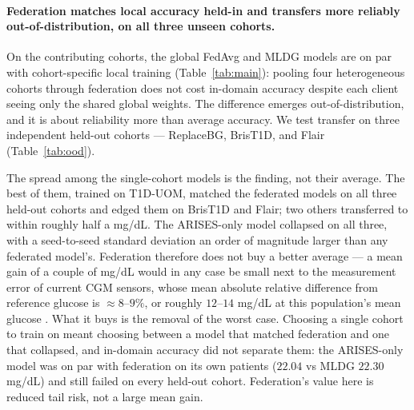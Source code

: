 \documentclass[10pt,letterpaper]{article}
\begin{document}
\paragraph{Federation matches local accuracy held-in and transfers more reliably
out-of-distribution, on all three unseen cohorts.} On the contributing cohorts,
the global FedAvg and MLDG models are on par with cohort-specific local training
(Table~\ref{tab:main}): pooling four
heterogeneous cohorts through federation does not cost in-domain accuracy despite
each client seeing only the shared global weights. The difference emerges
out-of-distribution, and it is about reliability more than average accuracy. We
test transfer on three independent held-out cohorts --- ReplaceBG, BrisT1D, and
Flair (Table~\ref{tab:ood}).

The spread among the single-cohort models is the finding, not their average.
The best of them, trained on T1D-UOM, matched the federated models on all
three held-out cohorts and edged them on BrisT1D and Flair; two others
transferred to within roughly half a mg/dL. The ARISES-only model collapsed on
all three, with a seed-to-seed standard deviation an order of magnitude larger
than any federated model's. Federation therefore does not buy a better average
--- a mean gain of a couple of mg/dL would in any case be small next to the
measurement error of current CGM sensors, whose mean absolute relative
difference from reference glucose is $\approx 8$--$9\%$, or roughly $12$--$14$
mg/dL at this population's mean glucose
\cite{garg2022dexcomg7,alva2023libre3}. What it buys is the removal of the
worst case. Choosing a single cohort to train on meant choosing between a model
that matched federation and one that collapsed, and in-domain accuracy did not
separate them: the ARISES-only model was on par with federation on its own
patients ($22.04$ vs MLDG $22.30$ mg/dL) and still failed on every held-out
cohort. Federation's value here is reduced tail risk, not a large mean gain.
\end{document}
